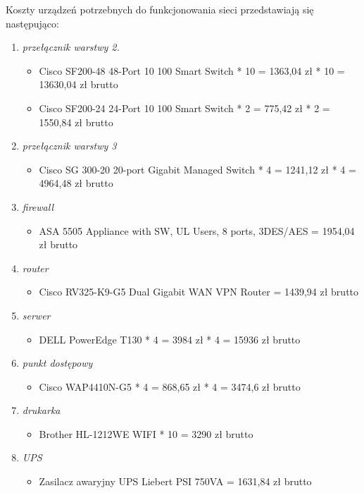 \documentclass[a4paper, 12pt]{article}
\begin{document}
Koszty urządzeń potrzebnych do funkcjonowania sieci przedstawiają się następująco:
\begin{enumerate}
	\item \textit{przełącznik warstwy 2.} 
	\begin{itemize}
	\item Cisco SF200-48 48-Port 10 100 Smart Switch * 10 = 1363,04 zł * 10 = 13630,04 zł brutto
	\item Cisco SF200-24 24-Port 10 100 Smart Switch * 2 = 775,42 zł * 2 = 1550,84 zł brutto
	\end{itemize}
	
    \item \textit{przełącznik warstwy 3} 
    \begin{itemize}
	\item Cisco SG 300-20 20-port Gigabit Managed Switch * 4 = 1241,12 zł * 4 = 4964,48 zł brutto
	\end{itemize}
    
    \item \textit{firewall} 
	\begin{itemize}
	\item ASA 5505 Appliance with SW, UL Users, 8 ports, 3DES/AES = 1954,04 zł brutto
	\end{itemize}    
    
    \item \textit{router} 
	\begin{itemize}
	\item Cisco RV325-K9-G5 Dual Gigabit WAN VPN Router = 1439,94 zł brutto
	\end{itemize}   
    
    \item \textit{serwer} 
	\begin{itemize}
	\item DELL PowerEdge T130 * 4 = 3984 zł * 4 = 15936 zł brutto
	\end{itemize}   
   
    \item \textit{punkt dostępowy} 
	\begin{itemize}
	\item Cisco WAP4410N-G5 * 4 = 868,65 zł * 4 =  3474,6 zł brutto
	\end{itemize}   
    
    \item \textit{drukarka} 
	\begin{itemize}
	\item Brother HL-1212WE WIFI * 10 = 3290 zł brutto
	\end{itemize}

	\item \textit{UPS} 
	\begin{itemize}
	\item Zasilacz awaryjny UPS Liebert PSI 750VA = 1631,84 zł brutto
	\end{itemize}  
\end{enumerate}
\end{document}
